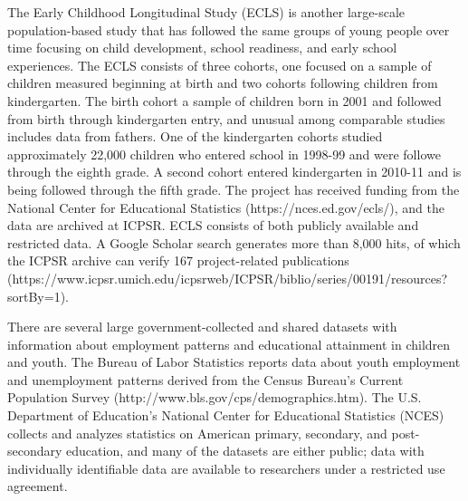\documentclass[letterpaper,man,apacite]{apa6}
\begin{document}
The Early Childhood Longitudinal Study (ECLS) is another large-scale population-based study that has followed the same groups of young people over time focusing on child development, school readiness, and early school experiences. 
The ECLS consists of three cohorts, one focused on a sample of children measured beginning at birth and two cohorts following children from kindergarten.
The birth cohort a sample of children born in 2001 and followed from birth through kindergarten entry, and unusual among comparable studies includes data from fathers. 
One of the kindergarten cohorts studied approximately 22,000 children who entered school in 1998-99 and were followe through the eighth grade. 
A second cohort entered kindergarten in 2010-11 and is being followed through the fifth grade.
The project has received funding from the National Center for Educational Statistics (https://nces.ed.gov/ecls/), and the data are archived at ICPSR.
ECLS consists of both publicly available and restricted data.
A Google Scholar search generates more than 8,000 hits, of which the ICPSR archive can verify 167 project-related publications (https://www.icpsr.umich.edu/icpsrweb/ICPSR/biblio/series/00191/resources?sortBy=1).

There are several large government-collected and shared datasets with information about employment patterns and educational attainment in children and youth.
The Bureau of Labor Statistics reports data about youth employment and unemployment patterns derived from the Census Bureau's Current Population Survey (http://www.bls.gov/cps/demographics.htm).
The U.S. Department of Education's National Center for Educational Statistics (NCES) collects and analyzes statistics on American primary, secondary, and post-secondary education, and many of the datasets are either public; data with individually identifiable data are available to researchers under a restricted use agreement.
\end{document}

